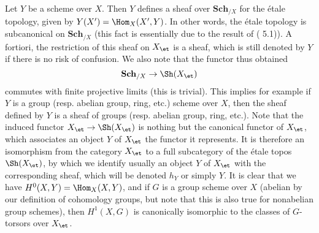 \begin{example}\label{scheme etale site subcanonical}
Let $Y$ be a scheme over $X$. Then $Y$ defines a sheaf over $\mathbf{Sch}_{/X}$ for the \'etale topology, given by $Y(X')=\Hom_X(X',Y)$. In other words, the \'etale topology is subcanonical on $\mathbf{Sch}_{/X}$ (this fact is essentially due to the result of (\cite{SGA1}  5.1)). A fortiori, the restriction of this sheaf on $X_\et$ is a sheaf, which is still denoted by $Y$ if there is no risk of confusion. We also note that the functor thus obtained
\[\mathbf{Sch}_{/X}\to\Sh(X_\et)\]
commutes with finite projective limits (this is trivial). This implies for example if $Y$ is a group (resp. abelian group, ring, etc.) scheme over $X$, then the sheaf defined by $Y$ is a sheaf of groups (resp. abelian group, ring, etc.). Note that the induced functor $X_\et\to\Sh(X_\et)$ is nothing but the canonical functor of $X_\et$, which associates an object $Y$ of $X_\et$ the functor it represents. It is therefore an isomorphism from the category $X_\et$ to a full subcategory of the \'etale topos $\Sh(X_\et)$, by which we identify usually an object $Y$ of $X_\et$ with the corresponding sheaf, which will be denoted $h_Y$ or simply $Y$. It is clear that we have $H^0(X,Y)=\Hom_X(X,Y)$, and if $G$ is a group scheme over $X$ (abelian by our definition of cohomology groups, but note that this is also true for nonabelian group schemes), then $H^1(X,G)$ is canonically isomorphic to the classes of $G$-torsors over $X_\et$.
\end{example}

